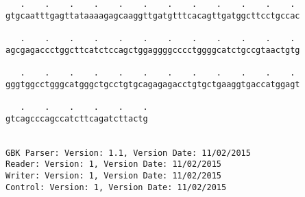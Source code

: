 \documentclass{article}
\begin{document}
\begin{Verbatim}
   .    .    .    .    .    .    .    .    .    .    .    . 
gtgcaatttgagttataaaagagcaaggttgatgtttcacagttgatggcttcctgccac
                                                            
   .    .    .    .    .    .    .    .    .    .    .    . 
agcgagaccctggcttcatctccagctggaggggcccctggggcatctgccgtaactgtg
                                                            
   .    .    .    .    .    .    .    .    .    .    .    . 
gggtggcctgggcatgggctgcctgtgcagagagacctgtgctgaaggtgaccatggagt
                                                            
   .    .    .    .    .    .
gtcagcccagccatcttcagatcttactg
                             
                             
GBK Parser: Version: 1.1, Version Date: 11/02/2015
Reader: Version: 1, Version Date: 11/02/2015
Writer: Version: 1, Version Date: 11/02/2015
Control: Version: 1, Version Date: 11/02/2015
\end{Verbatim}
\end{document}
